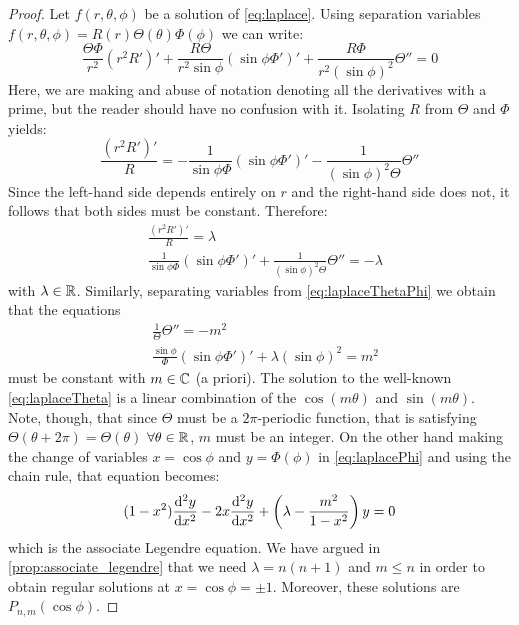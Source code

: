 \documentclass[../main.tex]{subfiles}
\begin{document}
\begin{proof}
  Let $f(r,\theta,\phi)$ be a solution of \cref{eq:laplace}. Using separation variables $f(r,\theta,\phi)=R(r)\Theta(\theta)\Phi(\phi)$ we can write:
  \begin{equation}
    \frac{\Theta\Phi}{r^2}{(r^2R')}'+\frac{R\Theta}{r^2\sin\phi}{(\sin\phi\Phi')}'+\frac{R\Phi}{r^2{(\sin\phi)}^2}\Theta''=0
  \end{equation}
  Here, we are making and abuse of notation denoting all the derivatives with a prime, but the reader should have no confusion with it. Isolating $R$ from $\Theta$ and $\Phi$ yields:
  \begin{equation}
    \frac{{(r^2R')}'}{R}=-\frac{1}{\sin\phi\Phi}{(\sin\phi\Phi')}'-\frac{1}{{(\sin\phi)}^2\Theta}\Theta''
  \end{equation}
  Since the left-hand side depends entirely on $r$ and the right-hand side does not, it follows that both sides must be constant. Therefore:
  \begin{align}
    \label{eq:laplaceR}        & \frac{{(r^2R')}'}{R}=\lambda                                                               \\
    \label{eq:laplaceThetaPhi} & \frac{1}{\sin\phi\Phi}{(\sin\phi\Phi')}'+\frac{1}{{(\sin\phi)}^2\Theta}\Theta''  =-\lambda
  \end{align}
  with $\lambda\in\mathbb{R}$. Similarly, separating variables from \cref{eq:laplaceThetaPhi} we obtain that the equations
  \begin{align}
    \label{eq:laplaceTheta} & \frac{1}{\Theta}\Theta''  =-m^2                                     \\
    \label{eq:laplacePhi}   & \frac{\sin\phi}{\Phi}{(\sin\phi\Phi')}'+\lambda{(\sin\phi)}^2  =m^2
  \end{align}
  must be constant with $m\in\mathbb{C}$ (a priori). The solution to the well-known \cref{eq:laplaceTheta} is a linear combination of the $\cos(m\theta)$ and $\sin(m\theta)$. Note, though, that since $\Theta$ must be a $2\pi$-periodic function, that is satisfying $\Theta(\theta+2\pi)=\Theta(\theta)$ $\forall\theta\in\mathbb{R}$, $m$ must be an integer. On the other hand making the change of variables $x=\cos \phi$ and $y=\Phi(\phi)$ in \cref{eq:laplacePhi} and using the chain rule, that equation becomes:
  \begin{equation}\label{}
    (1-x^2)\dv[2]{y}{x}-2x\dv[2]{y}{x}+\left(\lambda-\frac{m^2}{1-x^2}\right)y=0
  \end{equation}
  which is the associate Legendre equation. We have argued in \cref{prop:associate_legendre} that we need $\lambda=n(n+1)$ and $m\leq n$ in order to obtain regular solutions at $x=\cos\phi=\pm 1$. Moreover, these solutions are $P_{n,m}(\cos\phi)$.


\end{proof}
\end{document}
